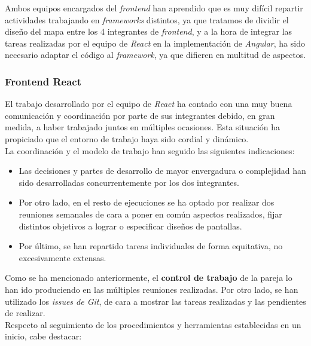 \documentclass[11pt, a4paper, titlepage]{article}
\begin{document}
Ambos equipos encargados del \textit{frontend} han aprendido que es muy difícil repartir actividades trabajando en \textit{frameworks} distintos, ya que tratamos de dividir el diseño del mapa entre los 4 integrantes de \textit{frontend}, y a la hora de integrar las tareas realizadas por el equipo de \textit{React} en la implementación de \textit{Angular}, ha sido necesario adaptar el código al \textit{framework}, ya que difieren en multitud de aspectos.

\subsubsection{Frontend React}


El trabajo desarrollado por el equipo de \textit{React} ha contado con una muy buena comunicación y coordinación por parte de sus integrantes debido, en gran medida, a haber trabajado juntos en múltiples ocasiones. Esta situación ha propiciado que el entorno de trabajo haya sido cordial y dinámico. \\

La coordinación y el modelo de trabajo han seguido las siguientes indicaciones:

\begin{itemize}
    \item Las decisiones y partes de desarrollo de mayor envergadura o complejidad han sido desarrolladas concurrentemente por los dos integrantes.
    \item Por otro lado, en el resto de ejecuciones se ha optado por realizar dos reuniones semanales de cara a poner en común aspectos realizados, fijar distintos objetivos a lograr o especificar diseños de pantallas.
    \item Por último, se han repartido tareas individuales de forma equitativa, no excesivamente extensas.
\end{itemize}

Como se ha mencionado anteriormente, el \textbf{control de trabajo} de la pareja lo han ido produciendo en las múltiples reuniones realizadas. Por otro lado, se han utilizado los \textit{issues de Git}, de cara a mostrar las tareas realizadas y las pendientes de realizar. \\

Respecto al seguimiento de los procedimientos y herramientas establecidas en un inicio, cabe destacar:
\end{document}

